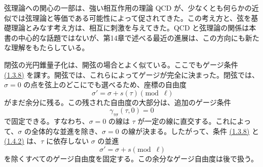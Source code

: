 弦理論への関心の一部は、強い相互作用の理論 QCD が、少なくとも何らかの近似では弦理論と等価である可能性によって促されてきた。この考え方と、弦を基礎理論とみなす考え方は、相互に刺激を与えてきた。QCD と弦理論の関係は本書の中心的な話題ではないが、第14章で述べる最近の進展は、この方向にも新たな理解をもたらしている。

\label{sec:1.4}

閉弦の光円錐量子化は、開弦の場合とよく似ている。ここでもゲージ条件 \hyperref[eq:1.3.8a]{(1.3.8)} を課す。開弦では、これらによってゲージが完全に決まった。閉弦では、$\sigma=0$ の点を弦上のどこにでも選べるため、座標の自由度
\begin{equation}
\sigma'=\sigma+s(\tau)\pmod{\ell}
\tag{1.4.1}\label{eq:1.4.1}
\end{equation}
がまだ余分に残る。この残された自由度の大部分は、追加のゲージ条件
\begin{equation}
\gamma_{\tau\sigma}(\tau,0)=0
\tag{1.4.2}\label{eq:1.4.2}
\end{equation}
で固定できる。すなわち、$\sigma=0$ の線は $\tau$ が一定の線に直交する。これによって、$\sigma$ の全体的な並進を除き、$\sigma=0$ の線が決まる。したがって、条件 \hyperref[eq:1.3.8a]{(1.3.8)} と \hyperref[eq:1.4.2]{(1.4.2)} は、$\tau$ に依存しない $\sigma$ の並進
\begin{equation}
\sigma'=\sigma+s\pmod{\ell}
\tag{1.4.3}\label{eq:1.4.3}
\end{equation}
を除くすべてのゲージ自由度を固定する。この余分なゲージ自由度は後で扱う。

